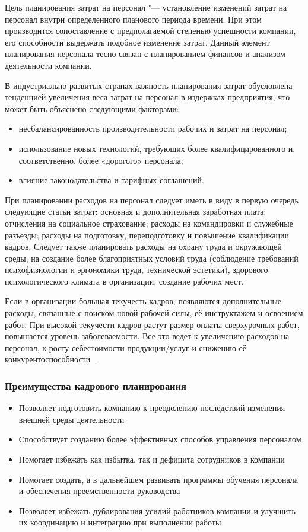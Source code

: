 \documentclass{../industrial-development}
\begin{document}
\lecturenotes

\alert{Цель планирования затрат на персонал} "--- установление изменений затрат на персонал внутри определенного планового периода времени. При этом производится сопоставление с предполагаемой степенью успешности компании, его способности выдержать подобное изменение затрат. Данный элемент планирования персонала тесно связан с планированием финансов и анализом деятельности компании.

В индустриально развитых странах важность планирования затрат обусловлена тенденцией увеличения веса затрат на персонал в издержках предприятия, что может быть объяснено следующими факторами:
\begin{itemize}
\item несбалансированность производительности рабочих и затрат на персонал;
\item использование новых технологий, требующих более квалифицированного и, соответственно, более «дорогого» персонала;
\item влияние законодательства и тарифных соглашений.
\end{itemize}

При планировании расходов на персонал следует иметь в виду в первую очередь следующие статьи затрат: основная и дополнительная заработная плата; отчисления на социальное страхование; расходы на командировки и служебные разъезды; расходы на подготовку, переподготовку и повышение квалификации кадров. Следует также планировать расходы на охрану труда и окружающей среды, на создание более благоприятных условий труда (соблюдение требований психофизиологии и эргономики труда, технической эстетики), здорового психологического климата в организации, создание рабочих мест.

Если в организации большая текучесть кадров, появляются дополнительные расходы, связанные с поиском новой рабочей силы, её инструктажем и освоением работ. При высокой текучести кадров растут размер оплаты сверхурочных работ, повышается уровень заболеваемости. Все это ведет к увеличению расходов на персонал, к росту себестоимости продукции/услуг и снижению её конкурентоспособности~\cite{Durakova}.

\begin{frame} \frametitle{Преимущества кадрового планирования}
  \begin{itemize}
	\item Позволяет подготовить компанию к преодолению последствий изменения внешней среды деятельности
	\item	Способствует созданию более эффективных способов управления персоналом
	\item	Помогает избежать как избытка, так и дефицита сотрудников в компании
	\item	Помогает создать, а в дальнейшем развивать программы обучения персонала и обеспечения преемственности руководства
	\item	Позволяет избежать дублирования усилий работников компании и улучшить их координацию и интеграцию при выполнении работы 
	  \end{itemize}
\end{frame}
\end{document}
